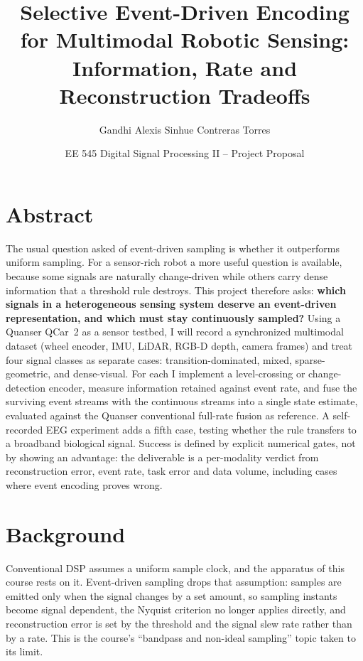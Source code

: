 \documentclass[11pt,a4paper]{article}
\title{ Selective Event-Driven Encoding for Multimodal Robotic Sensing: Information, Rate and Reconstruction Tradeoffs }
\author{ Gandhi Alexis Sinhue Contreras Torres }
\date{ EE 545 Digital Signal Processing II -- Project Proposal }
\begin{document}
\maketitle

\section{Abstract}

The usual question asked of event-driven sampling is whether it outperforms uniform
sampling. For a sensor-rich robot a more useful question is available, because some
signals are naturally change-driven while others carry dense information that a
threshold rule destroys. This project therefore asks: \textbf{which signals in a heterogeneous sensing
system deserve an event-driven representation, and which must stay continuously
sampled?} Using a Quanser QCar~2 as a sensor testbed, I will record a synchronized
multimodal dataset (wheel encoder, IMU, LiDAR, RGB-D depth, camera frames) and treat
four signal classes as separate cases: transition-dominated, mixed, sparse-geometric,
and dense-visual. For each I implement a level-crossing or change-detection encoder,
measure information retained against event rate, and fuse the surviving event streams
with the continuous streams into a single state estimate, evaluated against the Quanser
conventional full-rate fusion as reference. A self-recorded EEG experiment adds a fifth case,
testing whether the rule transfers to a broadband biological signal. Success is defined
by explicit numerical gates, not by showing an advantage: the deliverable is a
per-modality verdict from reconstruction error, event rate, task error and data volume,
including cases where event encoding proves wrong.

\section{Background}

Conventional DSP assumes a uniform sample clock, and the apparatus of this course rests
on it. Event-driven sampling drops that assumption: samples are emitted only when the
signal changes by a set amount, so sampling instants become signal dependent, the
Nyquist criterion no longer applies directly, and reconstruction error is set by the
threshold and the signal slew rate rather than by a rate. This is the course's
``bandpass and non-ideal sampling'' topic taken to its limit.
\end{document}
